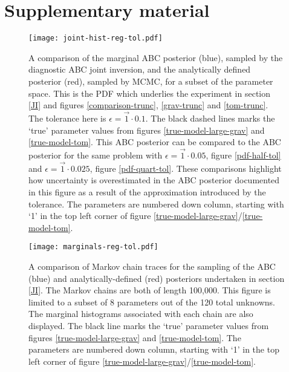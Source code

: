\chapter{Supplementary material}
\label{supplementary-material}
\newpage
\begin{figure}[H]
	\centering
	\texttt{[image: joint-hist-reg-tol.pdf]}
	\caption{A comparison of the marginal ABC posterior (blue), sampled by the diagnostic ABC joint inversion, and the analytically defined posterior (red), sampled by MCMC, for a subset of the parameter space. This is the PDF which underlies the experiment in section \ref{JI} and figures \ref{comparison-trunc}, \ref{grav-trunc} and \ref{tom-trunc}. The tolerance here is $\epsilon = \vec{1}\cdot0.1$. The black dashed lines marks the `true' parameter values from figures \ref{true-model-large-grav} and \ref{true-model-tom}. This ABC posterior can be compared to the ABC posterior for the same problem with $\epsilon = \vec{1}\cdot0.05$, figure \ref{pdf-half-tol} and $\epsilon = \vec{1}\cdot0.025$, figure \ref{pdf-quart-tol}. These comparisons highlight how uncertainty is overestimated in the ABC posterior documented in this figure as a result of the approximation introduced by the tolerance. The parameters are numbered down column, starting with `1' in the top left corner of figure \ref{true-model-large-grav}/\ref{true-model-tom}.}
	\label{pdf-reg-tol}
\end{figure}

\begin{figure}[H]
	\centering
	\texttt{[image: marginals-reg-tol.pdf]}
	\caption{A comparison of Markov chain traces for the sampling of the ABC (blue) and analytically-defined (red) posteriors undertaken in section \ref{JI}. The Markov chains are both of length 100,000. This figure is limited to a subset of 8 parameters out of the 120 total unknowns. The marginal histograms associated with each chain are also displayed. The black line marks the `true' parameter values from figures \ref{true-model-large-grav} and \ref{true-model-tom}. The parameters are numbered down column, starting with `1' in the top left corner of figure \ref{true-model-large-grav}/\ref{true-model-tom}.}
	\label{marginal-reg-tol}
\end{figure}

